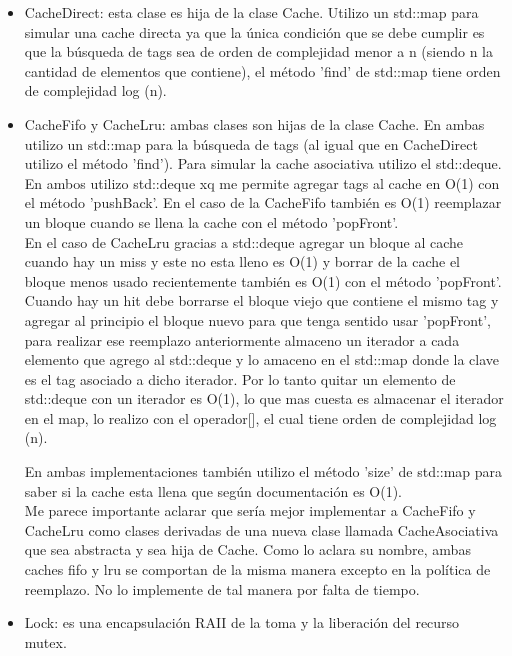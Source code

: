 \documentclass[a4paper,12pt]{report}
\begin{document}
\begin{itemize}
\item CacheDirect: esta clase es hija de la clase Cache. Utilizo un std::map para simular una cache directa ya que la \'unica condici\'on que se debe cumplir es que la b\'usqueda de tags sea de orden de complejidad menor a n (siendo n la cantidad de elementos que contiene), el m\'etodo 'find' de std::map tiene orden de complejidad log (n).

\item CacheFifo y CacheLru: ambas clases son hijas de la clase Cache. En ambas utilizo un std::map para la b\'usqueda de tags (al igual que en CacheDirect utilizo el m\'etodo 'find'). Para simular la cache asociativa utilizo el std::deque. En ambos utilizo std::deque xq me permite agregar tags al cache en O(1) con el m\'etodo 'pushBack'. En el caso de la CacheFifo tambi\'en es  O(1) reemplazar un bloque cuando se llena la cache con el m\'etodo 'popFront'. \\

En el caso de CacheLru gracias a std::deque agregar un bloque al cache cuando hay un miss y este no esta lleno es O(1) y borrar de la cache el bloque menos usado recientemente tambi\'en es O(1) con el m\'etodo 'popFront'. Cuando hay un hit debe borrarse el bloque viejo que contiene el mismo tag y agregar al principio el bloque nuevo para que tenga sentido usar 'popFront', para realizar ese reemplazo anteriormente almaceno un iterador a cada elemento que agrego al std::deque y lo amaceno en el std::map donde la clave es el tag asociado a dicho iterador.  Por lo tanto quitar un elemento de std::deque con un iterador es O(1), lo que mas cuesta es almacenar el iterador en el map, lo realizo con el operador[], el cual tiene  orden de complejidad log (n).

En ambas implementaciones tambi\'en utilizo el m\'etodo 'size' de std::map para saber si la cache esta llena que seg\'un documentaci\'on es O(1).\\

Me parece importante aclarar que ser\'ia mejor implementar a CacheFifo y CacheLru como clases derivadas de una nueva clase llamada CacheAsociativa que sea abstracta y sea hija de Cache. Como lo aclara su nombre, ambas caches fifo y lru se comportan de la misma manera excepto en la pol\'itica de reemplazo. No lo implemente de tal manera por falta de tiempo.
 
\item Lock: es una encapsulaci\'on RAII de la toma y la liberaci\'on del recurso mutex.


\end{itemize}
\end{document}
